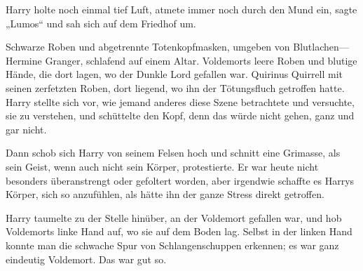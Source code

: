 Harry holte noch einmal tief Luft, atmete immer noch durch den Mund ein, sagte
„Lumos“ und sah sich auf dem Friedhof um.





Schwarze Roben und abgetrennte Totenkopfmasken, umgeben von Blutlachen—Hermine Granger, schlafend auf einem Altar. Voldemorts leere Roben und blutige Hände, die dort lagen, wo der Dunkle Lord gefallen war. Quirinus Quirrell mit seinen zerfetzten Roben, dort liegend, wo ihn der Tötungsfluch getroffen hatte. Harry stellte sich vor, wie jemand anderes diese Szene betrachtete und versuchte, sie zu verstehen, und schüttelte den Kopf, denn das würde nicht gehen, ganz und gar nicht.

Dann schob sich Harry von seinem Felsen hoch und schnitt eine Grimasse, als sein Geist, wenn auch nicht sein Körper, protestierte. Er war heute nicht besonders überanstrengt oder gefoltert worden, aber irgendwie schaffte es Harrys Körper, sich so anzufühlen, als hätte ihn der ganze Stress direkt getroffen.

Harry taumelte zu der Stelle hinüber, an der Voldemort gefallen war, und hob Voldemorts linke Hand auf, wo sie auf dem Boden lag.
Selbst in der linken Hand konnte man die schwache Spur von Schlangenschuppen erkennen; es war ganz eindeutig Voldemort. Das war gut so.

